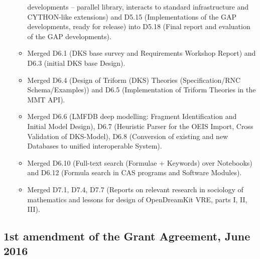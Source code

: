 \begin{enumerate}
\begin{itemize}
    developments – parallel library, interacts to standard
    infrastructure and CYTHON-like extensions) and D5.15
    (Implementations of the GAP developments, ready for release) into
    D5.18 (Final report and evaluation of the GAP developments).
  \item Merged D6.1 (DKS base survey and Requirements Workshop Report)
    and D6.3 (initial DKS base Design).
  \item Merged D6.4 (Design of Triform (DKS) Theories
    (Specification/RNC Schema/Examples)) and D6.5 (Implementation of
    Triform Theories in the MMT API).
  \item Merged D6.6 (LMFDB deep modelling: Fragment Identification and
    Initial Model Design), D6.7 (Heuristic Parser for the OEIS Import,
    Cross Validation of DKS-Model), D6.8 (Conversion of existing and
    new Databases to unified interoperable System).
  \item Merged D6.10 (Full-text search (Formulae + Keywords) over
    Notebooks) and D6.12 (Formula search in CAS programs and Software
    Modules).
  \item Merged D7.1, D7.4, D7.7 (Reports on relevant research in
    sociology of mathematics and lessons for design of OpenDreamKit
    VRE, parts I, II, III).
  \end{itemize}
\end{enumerate}
\clearpage
\thispagestyle{empty}
\subsection*{1st amendment of the Grant Agreement, June 2016}

